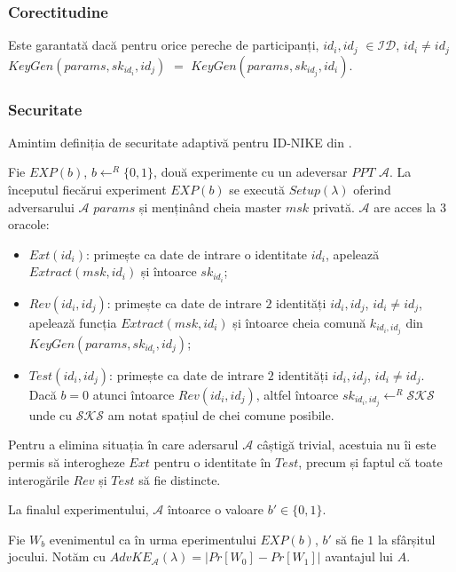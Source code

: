 \documentclass[oneside, 12pt]{book}
\begin{document}
\subsubsection{Corectitudine}
Este garantată dacă pentru orice pereche de participanți, $id_i, id_j$ $\in \mathcal{ID}$, $id_i \neq id_j$ $KeyGen(params, sk_{id_i}, id_j)$ $=$ $KeyGen(params, sk_{id_j}, id_i)$. 

\subsubsection{Securitate}
\label{subsub:nike-security}

Amintim definiția de securitate adaptivă pentru ID-NIKE din \cite{paterson:2009relations}.

Fie $EXP(b)$, $b \leftarrow^R \{0,1\}$, două experimente cu un adeversar $PPT$ $\mathcal{A}$. La începutul fiecărui experiment $EXP(b)$ se execută $Setup(\lambda)$ oferind adversarului $\mathcal{A}$ $params$ și menținând cheia master $msk$ privată. $\mathcal{A}$ are acces la $3$ oracole:
\begin{itemize}
	\item $Ext(id_i)$: primește ca date de intrare o identitate $id_i$, apelează $Extract(msk, id_i)$ și întoarce $sk_{id_i}$;
	\item $Rev(id_i, id_j)$: primește ca date de intrare $2$ identități $id_i, id_j$, $id_i \neq id_j$, apelează funcția $Extract(msk, id_i)$ și întoarce cheia comună $k_{id_i, id_j}$ din $KeyGen(params, sk_{id_i}, id_j)$;
	\item $Test(id_i, id_j)$: primește ca date de intrare $2$ identități $id_i, id_j$, $id_i \neq id_j$. Dacă $b = 0$ atunci întoarce $Rev(id_i, id_j)$, altfel întoarce $sk_{id_i, id_j} \leftarrow^R \mathcal{SKS}$ unde cu $\mathcal{SKS}$ am notat spațiul de chei comune posibile.
\end{itemize}

Pentru a elimina situația în care adersarul $\mathcal{A}$ câștigă trivial, acestuia nu îi este permis să interogheze $Ext$ pentru o identitate în $Test$, precum și faptul că toate interogările $Rev$ și $Test$ să fie distincte.

La finalul experimentului, $\mathcal{A}$ întoarce o valoare $b' \in \{0, 1\}$.

Fie $W_b$ evenimentul ca în urma eperimentului $EXP(b)$, $b'$ să fie $1$ la sfârșitul jocului. Notăm cu $AdvKE_{\mathcal{A}}(\lambda) = |Pr[W_0] - Pr[W_1]|$ avantajul lui $A$.
\end{document}

